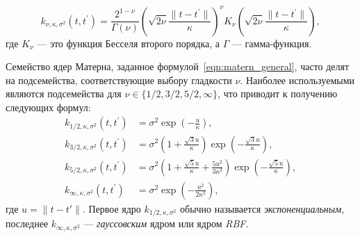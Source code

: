 \begin{equation} \label{eqn:matern_general}
k_{\nu, \kappa, \sigma^2}(t, t^\prime)
\!=\!
\frac{2^{1-\nu}}{\Gamma(\nu)}
\left(
  \sqrt{2 \nu}
  \frac{\|t-t^\prime\|}{\kappa}
\right)^{\nu}
\!\!\!
K_\nu\left(
  \sqrt{2 \nu}
  \frac{\|t-t^\prime\|}{\kappa}
\right),
\end{equation}
где $K_{\nu}$ --- это функция Бесселя второго порядка, а $\Gamma$ --- гамма-функция.

Семейство ядер Матерна, заданное формулой~\eqref{eqn:matern_general}, часто делят на подсемейства, соответствующие выбору гладкости $\nu$.
Наиболее используемыми являются подсемейства для $\nu \in \{1/2, 3/2, 5/2, \infty\}$, что приводит к получению следующих формул:
\begin{align}
\label{eqn:matern12}
k_{1/2, \kappa, \sigma^2}(t, t^\prime)
&=
\sigma^2 \exp\left(-\frac{u}{\kappa}\right),
\\
\label{eqn:matern32}
k_{3/2, \kappa, \sigma^2}(t, t^\prime)
&=
\sigma^2 \left(1+\frac{\sqrt{3}u}{\kappa}\right)\exp\left(-\frac{\sqrt{3}u}{\kappa}\right),
\\
\label{eqn:matern52}
k_{5/2, \kappa, \sigma^2}(t, t^\prime)
&=
\sigma^2 \left(1+\frac{\sqrt{5}u}{\kappa} + \frac{5 u^2}{3 \kappa^2}\right)\exp\left(-\frac{\sqrt{5}u}{\kappa}\right),
\\
\label{eqn:rbf}
k_{\infty, \kappa, \sigma^2}(t, t^\prime)
&=
\sigma^2 \exp\left(-\frac{u^2}{2 \kappa^2}\right),
\end{align}
где $u = \|t-t'\|$. Первое ядро $k_{1/2, \kappa, \sigma^2}$ обычно называется \emph{экспоненциальным}, последнее $k_{\infty, \kappa, \sigma^2}$ --- \emph{гауссовским} ядром или ядром \emph{RBF}.


